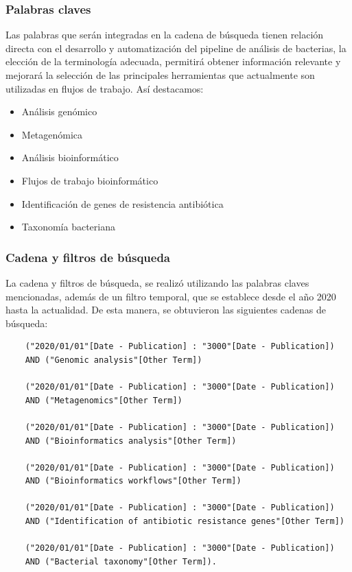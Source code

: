 \documentclass[12pt]{article}
\begin{document}
\subsubsection*{Palabras claves}

Las palabras que serán integradas en la cadena de búsqueda 
tienen relación directa con el desarrollo y automatización del 
pipeline de análisis de bacterias,  la  elección de la 
terminología adecuada, permitirá obtener información relevante y 
mejorará la selección de las principales herramientas que 
actualmente son utilizadas en flujos de trabajo. Así destacamos:

\begin{itemize}
    \item Análisis genómico
    \item Metagenómica
    \item Análisis bioinformático
    \item Flujos de trabajo bioinformático
    \item Identificación de genes de resistencia antibiótica
    \item Taxonomía bacteriana
\end{itemize}

\subsubsection*{Cadena y filtros de búsqueda}

La cadena y filtros de búsqueda, se realizó utilizando 
las palabras claves mencionadas, además de  un filtro 
temporal, que se establece desde el año 2020 hasta la
actualidad. De esta manera, se obtuvieron las siguientes 
cadenas de búsqueda:

\begin{verbatim}
    ("2020/01/01"[Date - Publication] : "3000"[Date - Publication]) 
    AND ("Genomic analysis"[Other Term])

    ("2020/01/01"[Date - Publication] : "3000"[Date - Publication]) 
    AND ("Metagenomics"[Other Term])

    ("2020/01/01"[Date - Publication] : "3000"[Date - Publication]) 
    AND ("Bioinformatics analysis"[Other Term])

    ("2020/01/01"[Date - Publication] : "3000"[Date - Publication]) 
    AND ("Bioinformatics workflows"[Other Term])

    ("2020/01/01"[Date - Publication] : "3000"[Date - Publication]) 
    AND ("Identification of antibiotic resistance genes"[Other Term])

    ("2020/01/01"[Date - Publication] : "3000"[Date - Publication]) 
    AND ("Bacterial taxonomy"[Other Term]).
\end{verbatim}
\end{document}
